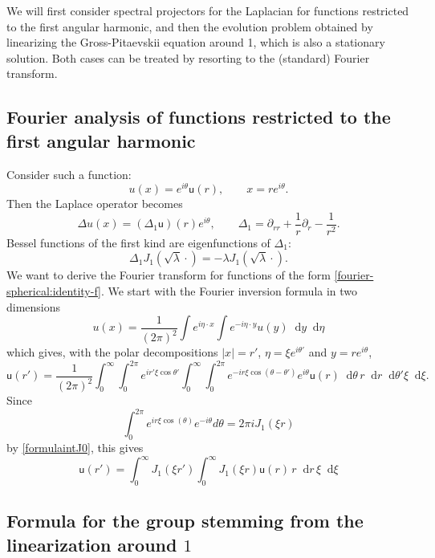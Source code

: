 \documentclass[11 pt]{amsart}
\theoremstyle{definition}
\theoremstyle{remark}
\numberwithin{equation}{section}
\newcommand{\dd}{\mathop{}\!\mathrm{d}}
\begin{document}
We will first consider spectral projectors for the Laplacian for functions restricted to the first angular harmonic, and then the evolution problem obtained by linearizing the Gross-Pitaevskii equation around 1, which is also a stationary solution. Both cases can be treated by resorting to the (standard) Fourier transform.

\subsection{Fourier analysis of functions restricted to the first angular harmonic}
Consider such a function:
\begin{equation} \label{fourier-spherical:identity-f}
u(x)=e^{i\theta}\mathsf u (r), \qquad x = re^{i \theta}.
\end{equation}
Then the Laplace operator becomes
$$
\Delta u(x) =(\Delta_1 \mathsf u)(r)e^{i\theta}, \qquad \Delta_1=\partial_{rr}+\frac{1}{r}\partial_r -\frac{1}{r^2}.
$$
Bessel functions of the first kind are eigenfunctions of $\Delta_1$:
$$
\Delta_1 J_1(\sqrt{\lambda}\cdot)=-\lambda J_1(\sqrt{\lambda}\cdot).
$$
We want to derive the Fourier transform for functions of the form \eqref{fourier-spherical:identity-f}. We start with the Fourier inversion formula in two dimensions
$$
u(x)=\frac{1}{(2\pi)^2}\int e^{i\eta \cdot x}\int e^{-i\eta \cdot y}u(y) \dd y \dd \eta
$$
which gives, with the polar decompositions $|x|=r'$, $\eta=\xi e^{i\theta'}$ and $y=re^{i\theta}$,
$$
\mathsf u(r')=\frac{1}{(2\pi)^2}\int_0^\infty \int_0^{2\pi} e^{ir' \xi \cos\theta'}\int_0^\infty \int_0^{2\pi} e^{-ir\xi \cos(\theta-\theta')}e^{i\theta}\mathsf u(r) \dd\theta \, r \dd r \dd \theta' \xi \dd\xi .
$$
Since
$$
\int_0^{2\pi}e^{ir \xi \cos(\theta)}e^{-i\theta}d\theta = 
2\pi i J_1(\xi r)
$$
by \eqref{formulaintJ0}, this gives
$$
\mathsf u(r')=\int_0^\infty J_1(\xi r')\int_0^\infty J_1(\xi r) \mathsf u(r) \,r \dd r \, \xi \dd \xi
$$

\subsection{Formula for the group stemming from the linearization around $1$}
\end{document}
